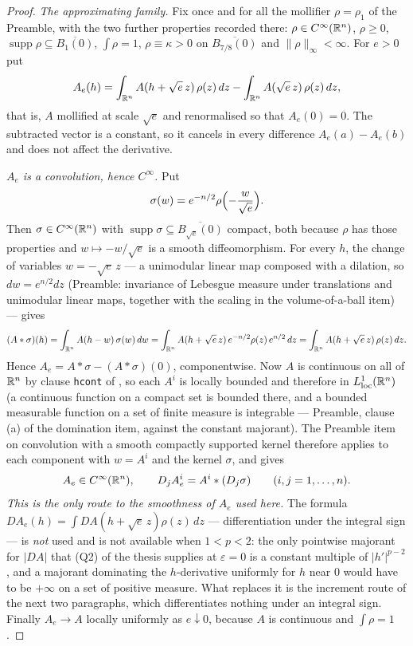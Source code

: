 \begin{proof}
\emph{The approximating family.}  Fix once and for all the mollifier
$\rho=\rho_1$ of the Preamble, with the two further properties recorded there:
$\rho\in C^\infty(\mathbb{R}^n)$, $\rho\ge0$, $\operatorname{supp}\rho\subseteq\overline{B_1(0)}$,
$\int\rho=1$, $\rho\equiv\kappa>0$ on $\overline{B_{7/8}(0)}$ and
$\|\rho\|_\infty<\infty$.  For $e>0$ put
\[
A_e(h)=\int_{\mathbb{R}^n}A(h+\sqrt e\,z)\,\rho(z)\,dz
-\int_{\mathbb{R}^n}A(\sqrt e\,z)\,\rho(z)\,dz ,
\]
that is, $A$ mollified at scale $\sqrt e$ and renormalised so that $A_e(0)=0$.
The subtracted vector is a constant, so it cancels in every difference
$A_e(a)-A_e(b)$ and does not affect the derivative.

\emph{$A_e$ is a convolution, hence $C^\infty$.}  Put
\[
\sigma(w)=e^{-n/2}\rho\Bigl(-\frac w{\sqrt e}\Bigr).
\]
Then $\sigma\in C^\infty(\mathbb{R}^n)$ with
$\operatorname{supp}\sigma\subseteq\overline{B_{\sqrt e}(0)}$ compact, both
because $\rho$ has those properties and $w\mapsto-w/\sqrt e$ is a smooth
diffeomorphism.  For every $h$, the change of variables $w=-\sqrt e\,z$ --- a
unimodular linear map composed with a dilation, so $dw=e^{n/2}dz$ (Preamble:
invariance of Lebesgue measure under translations and unimodular linear maps,
together with the scaling in the volume-of-a-ball item) --- gives
\[
(A*\sigma)(h)=\int_{\mathbb{R}^n}A(h-w)\,\sigma(w)\,dw
=\int_{\mathbb{R}^n}A(h+\sqrt e\,z)\,e^{-n/2}\rho(z)\,e^{n/2}\,dz
=\int_{\mathbb{R}^n}A(h+\sqrt e\,z)\,\rho(z)\,dz .
\]
Hence $A_e=A*\sigma-(A*\sigma)(0)$, componentwise.  Now $A$ is continuous on all
of $\mathbb{R}^n$ by clause \texttt{hcont} of , so each
$A^i$ is locally bounded and therefore in $L^1_{\mathrm{loc}}(\mathbb{R}^n)$ (a
continuous function on a compact set is bounded there, and a bounded measurable
function on a set of finite measure is integrable --- Preamble, clause (a) of the
domination item, against the constant majorant).  The Preamble item on
convolution with a smooth compactly supported kernel therefore applies to each
component with $w=A^i$ and the kernel $\sigma$, and gives
\[
A_e\in C^\infty(\mathbb{R}^n),
\qquad
D_j A_e^i=A^i*(D_j\sigma)\qquad(i,j=1,\dots,n).
\]
\emph{This is the only route to the smoothness of $A_e$ used here.}  The formula
$DA_e(h)=\int DA(h+\sqrt e\,z)\rho(z)\,dz$ --- differentiation under the integral
sign --- is \emph{not} used and is not available when $1<p<2$: the only
pointwise majorant for $|DA|$ that (Q2) of the thesis supplies at $\varepsilon=0$ is a
constant multiple of $|h'|^{p-2}$, and a majorant dominating the $h$-derivative
uniformly for $h$ near $0$ would have to be $+\infty$ on a set of positive
measure.  What replaces it is the increment route of the next two paragraphs,
which differentiates nothing under an integral sign.  Finally
$A_e\to A$ locally uniformly as $e\downarrow0$, because $A$ is continuous and
$\int\rho=1$.


\end{proof}

